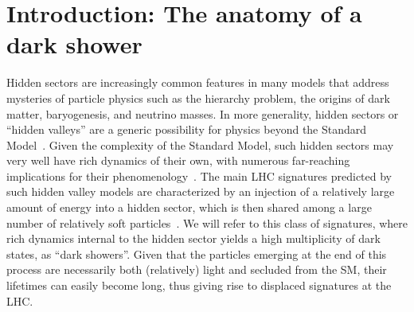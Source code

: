 
\section{Introduction: The anatomy of a dark shower}
\label{sec:darkshowerintro}

Hidden sectors are increasingly common features in many models that address mysteries of particle physics such as the hierarchy problem, the origins of dark matter, baryogenesis, and neutrino masses. In more generality, hidden sectors or ``hidden valleys'' are a generic possibility for physics beyond the Standard Model~\cite{Strassler:2006im,Han:2007ae}. Given the complexity of the Standard Model, such hidden sectors may very well have rich dynamics of their own, with numerous far-reaching implications for their phenomenology~\cite{Strassler:2006ri,Strassler:2006qa,Strassler:2008bv,Strassler:2008fv,Juknevich:2009ji}. The main LHC signatures predicted by such hidden valley models are characterized by an injection of a relatively large amount of energy into a hidden sector, which is then shared among a large number of relatively soft particles~\cite{Strassler:2008bv}. We will refer to this class of signatures, where rich dynamics internal to the hidden sector yields a high multiplicity of dark states, as ``dark showers''. Given that the particles emerging at the end of this process are necessarily both (relatively) light and secluded from the SM, their lifetimes can easily become long, thus giving rise to displaced signatures at the LHC.

